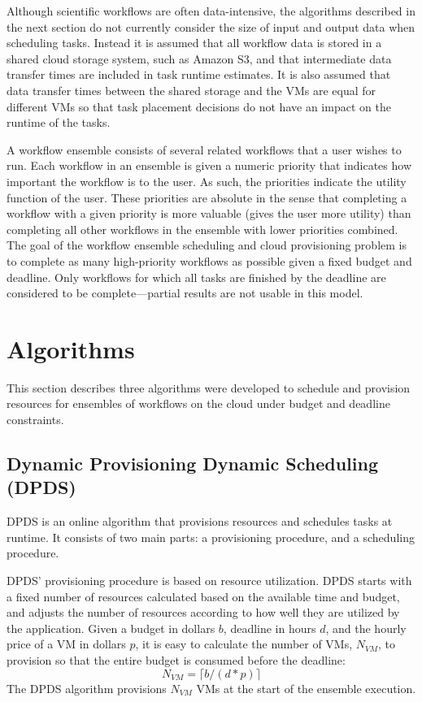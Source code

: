 \documentclass[conference]{IEEEtran}
\begin{document}
Although scientific workflows are often data-intensive, the algorithms described
in the next section do not currently consider the size of input and output data
when scheduling tasks. Instead it is assumed that all workflow data is stored in
a shared cloud storage system, such as Amazon S3, and that intermediate data
transfer times are included in task runtime estimates. It is also assumed that
data transfer times between the shared storage and the VMs are equal for
different VMs so that task placement decisions do not have an impact on the
runtime of the tasks.


A workflow ensemble consists of several related workflows that a user wishes to
run. Each workflow in an ensemble is given a numeric priority that indicates how
important the workflow is to the user. As such, the priorities indicate the
utility function of the user. These priorities are absolute in the sense that
completing a workflow with a given priority is more valuable (gives the user
more utility) than completing all other workflows in the ensemble with lower
priorities combined. The goal of the workflow ensemble scheduling and cloud
provisioning problem is to complete as many high-priority workflows as possible
given a fixed budget and deadline. Only workflows for which all tasks are
finished by the deadline are considered to be complete---partial results are not
usable in this model.



\section{Algorithms}
\label{sec:algorithms}

This section describes three algorithms were developed to schedule and provision resources for ensembles of workflows on the cloud under budget and deadline constraints.

\subsection{Dynamic Provisioning Dynamic Scheduling (DPDS)}
\label{sec:dpds}

DPDS is an online algorithm that provisions resources and schedules tasks at
runtime. It consists of two main parts: a provisioning procedure, and a
scheduling procedure.


DPDS' provisioning procedure is based on resource utilization. DPDS starts with
a fixed number of resources calculated based on the available time and budget,
and adjusts the number of resources according to how well they are utilized by
the application.
Given a budget in dollars $b$, deadline in hours $d$, and the hourly price of a
VM in dollars $p$, it is easy to calculate the number of VMs, $N_{VM}$, to
provision so that the entire budget is consumed before the deadline:
\begin{equation}
\label{eq:static-plan}
N_{VM} = \lceil b / (d * p) \rceil
\end{equation}
%
The DPDS algorithm provisions $N_{VM}$ VMs at the start of the ensemble execution.
\end{document}
